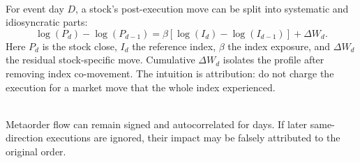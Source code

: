 \begin{model} \\
For event day $D$, a stock's post-execution move can be split into systematic and idiosyncratic parts:
\begin{equation*}
\log(P_d)-\log(P_{d-1})=
\beta\left[\log(I_d)-\log(I_{d-1})\right]+\Delta W_d.
\end{equation*}
Here $P_d$ is the stock close, $I_d$ the reference index, $\beta$ the index exposure, and $\Delta W_d$ the residual stock-specific move. Cumulative $\Delta W_d$ isolates the profile after removing index co-movement. The intuition is attribution: do not charge the execution for a market move that the whole index experienced.
\end{model}

\begin{caveat} \\
Metaorder flow can remain signed and autocorrelated for days. If later same-direction executions are ignored, their impact may be falsely attributed to the original order.
\end{caveat}
